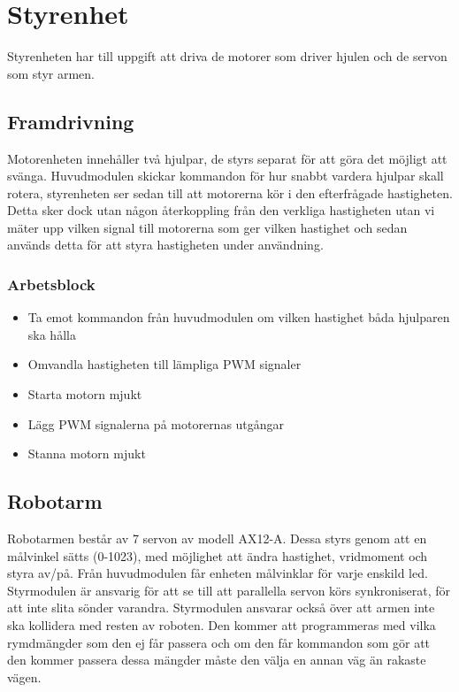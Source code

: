 
\section{Styrenhet}

Styrenheten har till uppgift att driva de motorer som driver hjulen och de servon som styr armen.

\subsection{Framdrivning}

Motorenheten innehåller två hjulpar, de styrs separat för att göra det möjligt att svänga. Huvudmodulen skickar kommandon för hur snabbt vardera hjulpar skall rotera, styrenheten ser sedan till att motorerna kör i den efterfrågade hastigheten. Detta sker dock utan någon återkoppling från den verkliga hastigheten utan vi mäter upp vilken signal till motorerna som ger vilken hastighet och sedan används detta för att styra hastigheten under användning.

\subsubsection{Arbetsblock}
\begin{itemize}
\item Ta emot kommandon från huvudmodulen om vilken hastighet båda hjulparen ska hålla
\item Omvandla hastigheten till lämpliga PWM signaler
\item Starta motorn mjukt 
\item Lägg PWM signalerna på motorernas utgångar 
\item Stanna motorn mjukt
\end{itemize}

\subsection{Robotarm}

Robotarmen består av 7 servon av modell AX12-A. Dessa styrs genom att en målvinkel sätts (0-1023), med möjlighet att ändra hastighet, vridmoment och styra av/på. Från huvudmodulen får enheten målvinklar för varje enskild led. Styrmodulen är ansvarig för att se till att parallella servon körs synkroniserat, för att inte slita sönder varandra. Styrmodulen ansvarar också över att armen inte ska kollidera med resten av roboten. Den kommer att programmeras med vilka rymdmängder som den ej får passera och om den får kommandon som gör att den kommer passera dessa mängder måste den välja en annan väg än rakaste vägen.  

